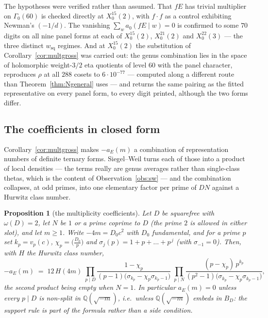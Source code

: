 \documentclass[11pt,reqno]{amsart}
\theoremstyle{plain}
\newtheorem{proposition}[theorem]{Proposition}
\theoremstyle{definition}
\newcommand{\Q}{\mathbb{Q}}
\begin{document}
The hypotheses were verified rather than assumed. That $fE$ has trivial multiplier on
$\Gamma_0(60)$ is checked directly at $X_0^{15}(2)$, with $f\cdot f$ as a control
exhibiting Newman's $(-1/d)$. The vanishing $\sum_w a_0(fE\mid w)=0$ is confirmed to some
$70$ digits on all nine panel forms at each of $X_0^{15}(2)$, $X_0^{21}(2)$ and
$X_0^{22}(3)$ --- the three distinct $w_{\mathrm{sq}}$ regimes. And at $X_0^{15}(2)$ the
substitution of Corollary~\ref{cor:multgross} was carried out: the genus combination lies
in the space of holomorphic weight-$3/2$ eta quotients of level $60$ with the panel
character, reproduces $\rho$ at all $288$ cosets to $6\cdot10^{-77}$ --- computed along a
different route than Theorem~\ref{thm:Ngeneral} uses --- and returns the same pairing as
the fitted representative on every panel form, to every digit printed, although the two
forms differ.

\subsection*{The coefficients in closed form}

Corollary~\ref{cor:multgross} makes $-a_E(m)$ a combination of representation numbers
of definite ternary forms. Siegel--Weil turns each of those into a product of local
densities --- the terms really are genus averages rather than single-class thetas, which is
the content of Observation~\ref{obs:sw} --- and the combination collapses, at odd primes, into
one elementary factor per prime of $DN$ against a Hurwitz class number.

\begin{proposition}[the multiplicity coefficients]\label{prop:closedcoef}
Let $D$ be squarefree with $\omega(D)=2$, let $N$ be $1$ or a prime coprime to $D$ (the
prime $2$ is allowed in either slot), and let $m\ge1$. Write $-4m=D_0c^2$ with $D_0$ fundamental, and for a prime $p$ set
$k_p=v_p(c)$, $\chi_p=\bigl(\tfrac{D_0}{p}\bigr)$ and
$\sigma_j(p)=1+p+\dots+p^{\,j}$ (with $\sigma_{-1}=0$). Then, with $H$ the Hurwitz class
number,
\[
  -a_E(m)\;=\;12\,H(4m)\;
  \prod_{p\mid D}\frac{1-\chi_p}{(p-1)\bigl(\sigma_{k_p}-\chi_p\sigma_{k_p-1}\bigr)}
  \;\prod_{p\mid N}\frac{(p-\chi_p)\,p^{k_p}}
                        {(p^2-1)\bigl(\sigma_{k_p}-\chi_p\sigma_{k_p-1}\bigr)} ,
\]
the second product being empty when $N=1$.
In particular $a_E(m)=0$ unless every $p\mid D$ is non-split in $\Q(\sqrt{-m})$, i.e.\
unless $\Q(\sqrt{-m})$ embeds in $B_D$: the support rule is part of the formula rather
than a side condition.
\end{proposition}
\end{document}
